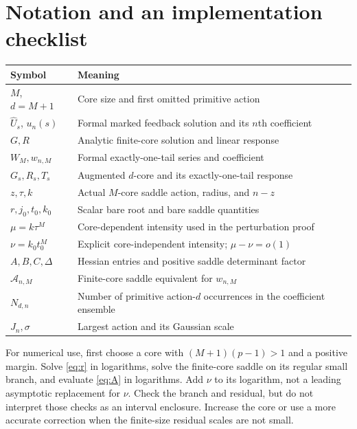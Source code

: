 \documentclass[11pt,a4paper]{article}
\numberwithin{equation}{section}
\theoremstyle{definition}
\theoremstyle{remark}
\newcommand{\U}{\widehat U}\newcommand{\Acal}{\mathcal A}
\begin{document}
\clearpage
\section{Notation and an implementation checklist}
\begin{longtable}{>{\raggedright\arraybackslash}p{}
                  >{\raggedright\arraybackslash}p{}}
\toprule
Symbol & Meaning\\\midrule\endhead
$M$, $d=M+1$ & Core size and first omitted primitive action\\[3pt]
$\U_s$, $u_n(s)$ & Formal marked feedback solution and its $n$th coefficient\\[3pt]
$G,R$ & Analytic finite-core solution and linear response\\[3pt]
$W_M,w_{n,M}$ & Formal exactly-one-tail series and coefficient\\[3pt]
$G_s,R_s,T_s$ & Augmented $d$-core and its exactly-one-tail response\\[3pt]
$z,\tau,k$ & Actual $M$-core saddle action, radius, and $n-z$\\[3pt]
$r,j_0,t_0,k_0$ & Scalar bare root and bare saddle quantities\\[3pt]
$\mu=k\tau^M$ & Core-dependent intensity used in the perturbation proof\\[3pt]
$\nu=k_0t_0^M$ & Explicit core-independent intensity; $\mu-\nu=o(1)$\\[3pt]
$A,B,C,\Delta$ & Hessian entries and positive saddle determinant factor\\[3pt]
$\Acal_{n,M}$ & Finite-core saddle equivalent for $w_{n,M}$\\[3pt]
$N_{d,n}$ & Number of primitive action-$d$ occurrences in the coefficient ensemble\\[3pt]
$J_n,\sigma$ & Largest action and its Gaussian scale\\
\bottomrule
\end{longtable}

For numerical use, first choose a core with $(M+1)(p-1)>1$ and a positive
margin. Solve \eqref{eq:r} in logarithms, solve the finite-core saddle on
its regular small branch, and evaluate \eqref{eq:A} in logarithms. Add
$\nu$ to its logarithm, not a leading asymptotic replacement for $\nu$.
Check the branch and residual, but do not interpret those checks as an
interval enclosure. Increase the core or use a more accurate correction
when the finite-size residual scales are not small.
\end{document}

